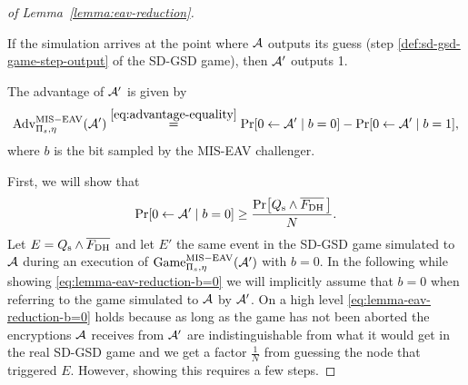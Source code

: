 \begin{proof}[of Lemma~\ref{lemma:eav-reduction}]
\begin{enumerate}[1.]
		      If the simulation arrives at the point where $\mathcal{A}$ outputs its guess (step \ref{def:sd-gsd-game-step-output} of the SD-GSD game), then $\mathcal{A}'$ outputs 1.
	\end{enumerate}

	The advantage of $\mathcal{A}'$ is given by
	\begin{equation} \label{eq:lemma-eav-reduction-advantage}
		\advantage{\Pi_s}{\eta}{MIS-EAV}(\adv') \stackrel{\eqref{eq:advantage-equality}}{=}  \pr{0 \from \adv' \mid b = 0} - \pr{0 \from \adv' \mid b = 1},
	\end{equation}
	where $b$ is the bit sampled by the MIS-EAV challenger.


	First, we will show that
	\begin{equation} \label{eq:lemma-eav-reduction-b=0}
		\pr{0 \from \adv' \mid b = 0} \ge \frac{\pr{\qs \land \overline{\fdh}\,}}{N}.
	\end{equation}
	Let $E = Q_\mathrm{s} \land \overline{F_\mathrm{DH}}$ and let $E'$ the same event in the SD-GSD game simulated to $\mathcal{A}$ during an execution of $\mathrm{Game}_{\Pi_s, \eta}^{\mathrm{MIS-EAV}}(\mathcal{A}')$ with $b = 0$. In the following while showing \eqref{eq:lemma-eav-reduction-b=0} we will implicitly assume that $b = 0$ when referring to the game simulated to $\mathcal{A}$ by $\mathcal{A}'$.
	On a high level \eqref{eq:lemma-eav-reduction-b=0} holds because as long as the game has not been aborted the encryptions $\mathcal{A}$ receives from $\mathcal{A}'$ are indistinguishable from what it would get in the real SD-GSD game and we get a factor $\frac{1}{N}$ from guessing the node that triggered $E$. However, showing this requires a few steps.


\end{proof}
